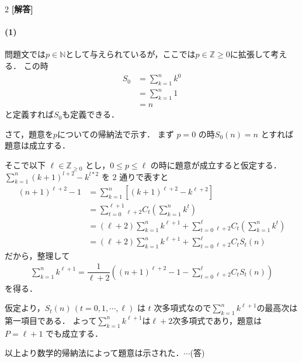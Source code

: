 \documentclass[../../main.tex]{subfiles}
\begin{document}
\setcounter{equation}{0}
\begin{oframed}
  
\end{oframed}
\setlength{\columnseprule}{0.4pt}
\begin{multicols}{2}
  {\bf [解答]}
  \paragraph{(1)}
  問題文では$p\in\mathbb{N}$として与えられているが，ここでは$p \in\mathbb{Z} \ge 0$に拡張して考える．
  この時
  \begin{align}
    S_0
    & = \sum_{k=1}^{n}k^{0} \\
    & = \sum_{k=1}^{n}1     \\
    & = n
  \end{align}
  と定義すれば$S_0$も定義できる．

  さて，題意を$p$についての帰納法で示す．
  まず $p=0$ の時$S_{0}(n)=n$ とすれば題意は成立する．

  そこで以下 $\ell \in \mathbb{Z}_{\ge 0}$ とし，$0 \le p \le \ell$ の時に題意が成立すると仮定する．
  $\sum_{k=1}^{n} (k+1)^{l+2} - k^{l*2}$ を $2$ 通りで表すと
  \begin{align}
    (n+1)^{\ell+2} - 1
    & = \sum_{k=1}^{n} \left[ (k+1)^{\ell+2} - k^{\ell+2} \right]                                                         \\
    & = \sum_{t=0}^{\ell+1} {}_{\ell+2}C_{t}\left(\sum_{k=1}^{n}k^t\right)                                                \\
    & = \left(\ell + 2 \right)\sum_{k=1}^{n}k^{\ell+1} + \sum_{t=0}^{\ell} {}_{\ell+2}C_{t}\left(\sum_{k=1}^{n}k^t\right) \\
    & = \left(\ell + 2 \right)\sum_{k=1}^{n}k^{\ell+1} + \sum_{t=0}^{\ell} {}_{\ell+2}C_{t} S_{t}(n)
  \end{align}
  だから，整理して
  \begin{align}
    \sum_{k=1}^{n}k^{\ell+1} = \dfrac{1}{\ell+2} \left( (n+1)^{\ell+2} - 1 - \sum_{t=0}^{\ell} {}_{\ell+2}C_{t} S_{t}(n)\right) \label{eq:1}
  \end{align}
  を得る．

  仮定より，$S_{t}(n)\, (t=0,1,\cdots,\ell)$ は $t$ 次多項式なので$\sum_{k=1}^{n}k^{\ell+1}$の最高次は第一項目である．
  よって$\sum_{k=1}^{n}k^{\ell+1}$は$\ell+2$次多項式であり，題意は $P=\ell+1$ でも成立する．

  以上より数学的帰納法によって題意は示された．$\cdots$(答)


\end{multicols}
\end{document}
